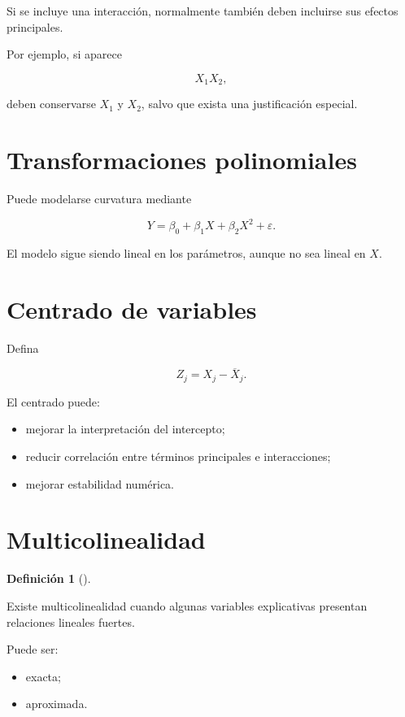 \documentclass[
  spanish,
  11pt,
  letterpaper,
  DIV=11,
  numbers=noendperiod]{scrreprt}
\providecommand{\tightlist}{%
  \setlength{\itemsep}{0pt}\setlength{\parskip}{0pt}}
\theoremstyle{definition}
\newtheorem{definition}{Definición}[chapter]
\theoremstyle{plain}
\theoremstyle{definition}
\theoremstyle{remark}
\begin{document}
Si se incluye una interacción, normalmente también deben incluirse sus
efectos principales.

Por ejemplo, si aparece

\[
X_1X_2,
\]

deben conservarse \(X_1\) y \(X_2\), salvo que exista una justificación
especial.

\section{Transformaciones
polinomiales}\label{transformaciones-polinomiales}

Puede modelarse curvatura mediante

\[
Y
=
\beta_0
+
\beta_1X
+
\beta_2X^2
+
\varepsilon.
\]

El modelo sigue siendo lineal en los parámetros, aunque no sea lineal en
\(X\).

\section{Centrado de variables}\label{centrado-de-variables}

Defina

\[
Z_j
=
X_j-\overline{X}_j.
\]

El centrado puede:

\begin{itemize}
\tightlist
\item
  mejorar la interpretación del intercepto;
\item
  reducir correlación entre términos principales e interacciones;
\item
  mejorar estabilidad numérica.
\end{itemize}

\section{Multicolinealidad}\label{multicolinealidad}

\begin{definition}[]\protect\hypertarget{def-multicolinealidad}{}\label{def-multicolinealidad}

Existe multicolinealidad cuando algunas variables explicativas presentan
relaciones lineales fuertes.

\end{definition}

Puede ser:

\begin{itemize}
\tightlist
\item
  exacta;
\item
  aproximada.
\end{itemize}
\end{document}
